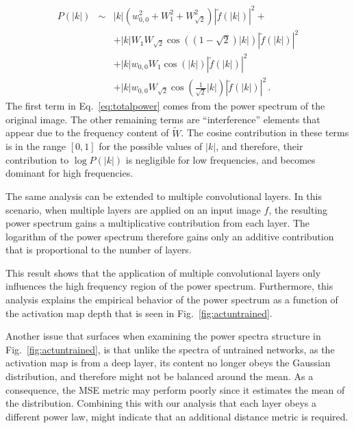 \documentclass{article}
\begin{document}
\begin{eqnarray}
    P\left( \vert k \vert \right) &\sim&  \vert k \vert \left(w_{0,0}^2 + W_1^2 + W_{\sqrt{2}}^2 \right)\left \vert \tilde f \left( \vert k \vert \right) \right \vert^2 + \nonumber  \\
    && + \vert k \vert  W_1W_{\sqrt{2}} \cos \left( \left(1 - \sqrt{2}\right)\vert k \vert \right)\left \vert \tilde f \left( \vert k \vert \right) \right \vert^2 \nonumber \\
    && + \vert k \vert  w_{0,0}W_{1} \cos \left( \vert k \vert \right)\left \vert \tilde f \left( \vert k \vert \right) \right \vert^2 \nonumber \\
    && + \vert k \vert  w_{0,0}W_{\sqrt{2}} \cos \left( \frac{1}{\sqrt{2}}\vert k \vert \right)\left \vert \tilde f \left( \vert k \vert \right) \right \vert^2 \,. 
    \label{eq:totalpower}
\end{eqnarray}
The first term in Eq.~\eqref{eq:totalpower} comes from the power spectrum of the original image. The other remaining terms are ``interference'' elements that appear due to the frequency content of $\tilde W$. The cosine contribution in these terms is in the range $\left[0,1 \right]$ for the possible values of $\vert k \vert$, and therefore, their contribution to $\log P\left(\vert k \vert  \right)$ is negligible for low frequencies, and becomes dominant for high frequencies. 

The same analysis can be extended to multiple convolutional layers. In this scenario, when multiple layers are applied on an input image $f$, the resulting power spectrum gains a multiplicative contribution from each layer. The logarithm of the power spectrum therefore gains only an additive contribution that is proportional to the number of layers. 

This result shows that the application of multiple convolutional layers only influences the high frequency region of the power spectrum. Furthermore, this analysis explains the empirical behavior of the power spectrum as a function of the activation map depth that is seen in Fig.~\ref{fig:actuntrained}.   

Another issue that surfaces when examining the power spectra structure in Fig.~\ref{fig:actuntrained}, is that unlike the spectra of untrained networks, as the activation map is from a deep layer, its content no longer obeys the Gaussian distribution, and therefore might not be balanced around the mean. As a consequence, the MSE metric may perform poorly since it estimates the mean of the distribution. Combining this with our analysis that each layer obeys a different power law, might indicate that an additional distance metric is required.
\end{document}
